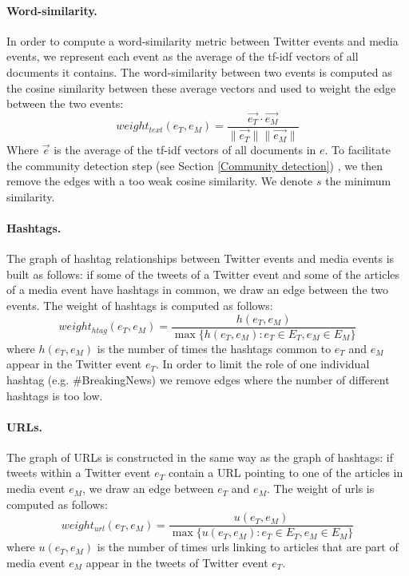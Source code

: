\paragraph{Word-similarity.}
In order to compute a word-similarity metric between Twitter events and media events, we represent each event as the average of the tf-idf vectors of all documents it contains. The word-similarity between two events is computed as the cosine similarity between these average vectors and used to weight the edge between the two events:
	\begin{equation}
    weight_{text}(e_T, e_M) = \frac{\vec{e_T} \cdot \vec{e_M}}{\| \vec{e_T}\|\| \vec{e_M}\|}
	\end{equation}
Where $\vec{e}$ is the average of the tf-idf vectors of all documents in $e$. To facilitate the community detection step (see Section \ref{Community detection}) , we then remove the edges with a too weak cosine similarity. We denote $s$ the minimum similarity.

\paragraph{Hashtags.} The graph of hashtag relationships between Twitter events and media events is built as follows: if some of the tweets of a Twitter event and some of the articles of a media event have hashtags in common, we draw an edge between the two events. The weight of hashtags is computed as follows:
\begin{equation}
    weight_{htag}(e_T, e_M) = \frac{h(e_T, e_M)}{\max \{h(e_T, e_M): e_T \in E_T,e_M \in E_M \}}
\end{equation}
where $h(e_T, e_M)$ is the number of times the hashtags common to $e_T$ and $e_M$ appear in the Twitter event $e_T$. In order to limit the role of one individual hashtag (e.g. \#BreakingNews) we remove edges where the number of different hashtags is too low.

\paragraph{URLs.} The graph of URLs is constructed in the same way as the graph of hashtags: if tweets within a Twitter event $e_T$ contain a URL pointing to one of the articles in media event $e_M$, we draw an edge between $e_T$ and $e_M$. The weight of urls is computed as follows:
\begin{equation}
    weight_{url}(e_T, e_M) = \frac{u(e_T, e_M)}{\max \{u(e_T, e_M): e_T \in E_T,e_M \in E_M \}}
\end{equation}
where $u(e_T, e_M)$ is the number of times urls linking to articles that are part of media event $e_M$ appear in the tweets of Twitter event $e_T$.

